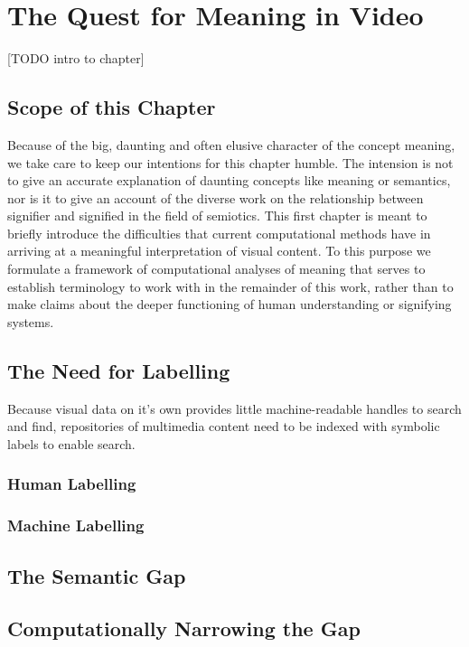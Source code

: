 \chapter{The Quest for Meaning in Video}
\label{ch:quest}

[TODO intro to chapter]

\section{Scope of this Chapter}

Because of the big, daunting and often elusive character of the concept meaning, we take care to keep our intentions for this chapter humble. The intension is not to give an accurate explanation of daunting concepts like meaning or semantics, nor is it to give an account of the diverse work on the relationship between signifier and signified in the field of semiotics. This first chapter is meant to briefly introduce the difficulties that current computational methods have in arriving at a meaningful interpretation of visual content. To this purpose we formulate a framework of computational analyses of meaning that serves to establish terminology to work with in the remainder of this work, rather than to make claims about the deeper functioning of human understanding or signifying systems.

\section{The Need for Labelling}

Because visual data on it's own provides little machine-readable handles to search and find, repositories of multimedia content need to be indexed with symbolic labels to enable search.


\subsection{Human Labelling}

\subsection{Machine Labelling}


\section{The Semantic Gap}


\section{Computationally Narrowing the Gap}

